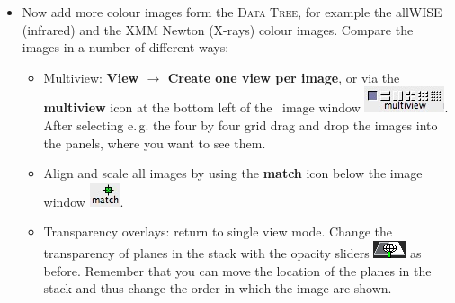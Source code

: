 \documentclass [a4paper, 12pt]{article}
\begin{document}
\begin{itemize}
    \item Now add more colour images form the \textsc{Data Tree}, for example
the allWISE (infrared) and the XMM Newton (X-rays) colour images. Compare the
images in a number of different ways:
    \begin{itemize}
        \item Multiview: \textbf{View $\rightarrow$ Create one view per image},
        or via the \textbf{multiview} icon at the bottom left of the \aladin\
        image window \includegraphics[width=0.1
        \textwidth]{../images/aladin_button_multiview.jpg}. After selecting
        e.\,g. the four by four grid drag and drop the images into the panels,
        where you want to see them.
        \item Align and scale all images by using the \textbf{match} icon below
        the image window \includegraphics[width=0.04
        \textwidth]{../images/aladin_button_match-views.jpg}.
        \item Transparency overlays: return to single view mode. Change the
        transparency of planes in the stack with the opacity sliders
        \includegraphics[width=0.04
        \textwidth]{../images/aladin_button_opacity.png} as before. Remember
        that you can move the location of the planes in the stack and thus
        change the order in which the image are shown.
    \end{itemize}


\end{itemize}
\end{document}
